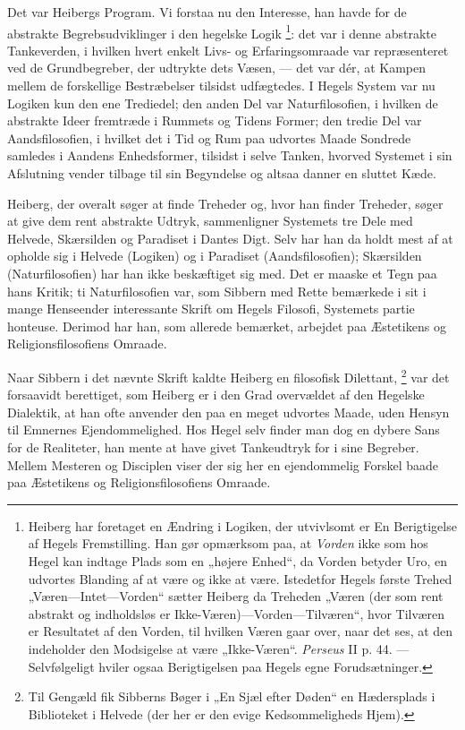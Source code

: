 \documentclass[12pt,a4paper,openany]{book}
\newcommand{\opage}[1]{\marginnote{\footnotesize\textit{[#1]}}}
\begin{document}
Det var Heibergs Program. Vi forstaa nu den Interesse, han havde for de
abstrakte Begrebsudviklinger i den hegelske Logik%
\footnote[1]{Heiberg har foretaget en Ændring i Logiken, der utvivlsomt er En
Berigtigelse af Hegels Fremstilling. Han gør opmærksom paa, at \textit{Vorden}
ikke som hos Hegel kan indtage Plads som en „højere Enhed“, da Vorden betyder
Uro, en udvortes Blanding af at være og ikke at være. Istedetfor Hegels første
Trehed „Væren---Intet---Vorden“ sætter Heiberg da Treheden „Væren (der som rent
abstrakt og indholdsløs er Ikke-Væren)---Vorden---Tilværen“, hvor Tilværen er
Resultatet af den Vorden, til hvilken Væren gaar over, naar det ses, at den
indeholder den Modsigelse at være „Ikke-Væren“. \textit{Perseus} II p. 44. ---
Selvfølgeligt hviler ogsaa Berigtigelsen paa Hegels egne Forudsætninger.}: det
var i denne abstrakte Tankeverden, i hvilken
\setcounter{footnote}{0}%
\opage{132}hvert enkelt Livs- og Erfaringsomraade var repræsenteret ved de
Grundbegreber, der udtrykte dets Væsen, --- det var dér, at Kampen mellem de
forskellige Bestræbelser tilsidst udfægtedes. I Hegels System var nu Logiken
kun den ene Trediedel; den anden Del var Naturfilosofien, i hvilken de
abstrakte Ideer fremtræde i Rummets og Tidens Former; den tredie Del var
Aandsfilosofien, i hvilket det i Tid og Rum paa udvortes Maade Sondrede
samledes i Aandens Enhedsformer, tilsidst i selve Tanken, hvorved Systemet i
sin Afslutning vender tilbage til sin Begyndelse og altsaa danner en sluttet Kæde.

Heiberg, der overalt søger at finde Treheder og, hvor han finder Treheder,
søger at give dem rent abstrakte Udtryk, sammenligner Systemets tre Dele med
Helvede, Skærsilden og Paradiset i Dantes Digt. Selv har han da holdt mest af
at opholde sig i Helvede (Logiken) og i Paradiset (Aandsfilosofien); Skærsilden
(Naturfilosofien) har han ikke beskæftiget sig med. Det er maaske et Tegn paa
hans Kritik; ti Naturfilosofien var, som Sibbern med Rette bemærkede i sit i
mange Henseender interessante Skrift om Hegels Filosofi, Systemets partie
honteuse. Derimod har han, som allerede bemærket, arbejdet paa Æstetikens og
Religionsfilosofiens Omraade.

Naar Sibbern i det nævnte Skrift kaldte Heiberg en filosofisk Dilettant,%
\footnote[1]{Til Gengæld fik Sibberns Bøger i „En Sjæl efter Døden“ en
Hædersplads i Biblioteket i Helvede (der her er den evige Kedsommeligheds
Hjem).} var det forsaavidt berettiget, som Heiberg er i den Grad overvældet af
den Hegelske Dialektik, at han ofte anvender den paa en meget udvortes Maade,
uden Hensyn til Emnernes Ejendommelighed. Hos Hegel selv finder man dog en
dybere Sans for de Realiteter, han mente at have givet Tankeudtryk for i sine
Begreber. Mellem Mesteren og
\setcounter{footnote}{0}%
\opage{133}Disciplen viser der sig her en ejendommelig Forskel baade paa
Æstetikens og Religionsfilosofiens Omraade.
\end{document}
